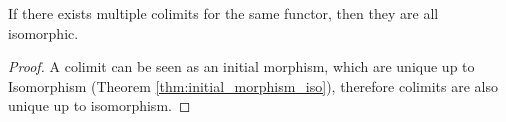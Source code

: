 \begin{theorem}
	If there exists multiple colimits for the same functor, then they are all
	isomorphic.

	\begin{proof}
		A colimit can be seen as an initial morphism, which are unique up to
		Isomorphism (Theorem \ref{thm:initial_morphism_iso}), therefore colimits are
		also unique up to isomorphism.
	\end{proof}
\end{theorem}